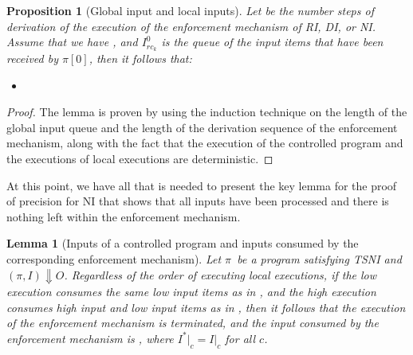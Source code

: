 \documentclass[10pt,a4paper,oneside]{article}
\newtheorem{lemma}{Lemma}[section]
\newtheorem{proposition}{Proposition}[section]
\def\execution#1#2#3{\ensuremath{(#1, #2)\Downarrow#3}}
\def\Irck#1#2{\ensuremath{I_{rc_{#2}}^{#1}}}
\def\channeleq#1#2#3{\ensuremath{\restrict{#1}{#3} = \restrict{#2}{#3}}}
\def\restrict#1#2{\ensuremath{{#1}|_{#2}}}
\def\chnl{\ensuremath{c}}
\def\Prog{\ensuremath{\pi}}
\def\Progl#1{\ensuremath{\Prog[#1]}}
\begin{document}
\begin{proposition}[Global input and local inputs] \label{prop:relationship:localinputqueue}
Let  be the number steps of derivation of the execution of the enforcement mechanism of RI, DI, or NI. Assume that we have , and \Irck{0}{k} is the queue of the input items that have been received by \Progl{0}, then it follows that: \begin{itemize}
\item 
\end{itemize}
\end{proposition}
\begin{proof}
The lemma is proven by using the induction technique on the length of the global input queue and the length of the derivation sequence of the enforcement mechanism, along with the fact that the execution of the controlled program and the executions of local executions are deterministic.
\end{proof}

At this point, we have all that is needed to present the key lemma for the proof of precision for NI that shows that all inputs have been processed and there is nothing left within the enforcement mechanism.


\begin{lemma}[Inputs of a controlled program and inputs consumed by the corresponding enforcement mechanism]\label{lem:ni:running}
Let \Prog\ be a program satisfying TSNI and \execution{\Prog}{I}{O}. Regardless of the order of executing local executions, if the low execution consumes the same low input items as in , and the high execution consumes high input and low input items as in , then it follows that the execution of the enforcement mechanism is terminated, and the input consumed by the enforcement mechanism is , where \channeleq{I^*}{I}{\chnl} for all \chnl.



\end{lemma}
\end{document}
